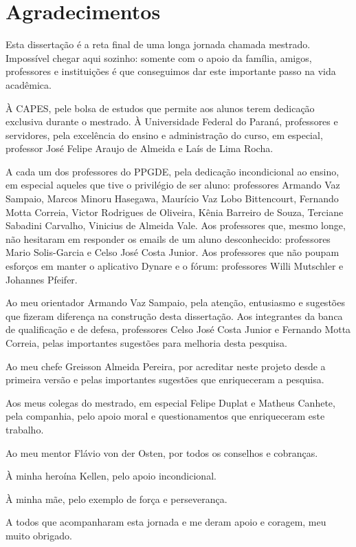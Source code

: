 \documentclass[
thesis.tex
]{subfiles}
\begin{document}
	
	\newpage
	
	\section*{Agradecimentos} %

	Esta dissertação é a reta final de uma longa jornada chamada mestrado. Impossível chegar aqui sozinho: somente com o apoio da família, amigos, professores e instituições é que conseguimos dar este importante passo na vida acadêmica.
	
	À CAPES, pele bolsa de estudos que permite aos alunos terem dedicação exclusiva durante o mestrado. À Universidade Federal do Paraná, professores e servidores, pela excelência do ensino e administração do curso, em especial, professor José Felipe Araujo de Almeida e Laís de Lima Rocha.

	A cada um dos professores do PPGDE, pela dedicação incondicional ao ensino, em especial aqueles que tive o privilégio de ser aluno: professores Armando Vaz Sampaio, Marcos Minoru Hasegawa, Maurício Vaz Lobo Bittencourt, Fernando Motta Correia, Victor Rodrigues de Oliveira, Kênia Barreiro de Souza, Terciane Sabadini Carvalho, Vinicius de Almeida Vale. Aos professores que, mesmo longe, não hesitaram em responder os emails de um aluno desconhecido: professores Mario Solis-Garcia e Celso José Costa Junior. Aos professores que não poupam esforços em manter o aplicativo Dynare e o fórum: professores Willi Mutschler e Johannes Pfeifer.
	
	Ao meu orientador Armando Vaz Sampaio, pela atenção, entusiasmo e sugestões que fizeram diferença na construção desta dissertação. Aos integrantes da banca de qualificação e de defesa, professores Celso José Costa Junior e Fernando Motta Correia, pelas importantes sugestões para melhoria desta pesquisa.

	Ao meu chefe Greisson Almeida Pereira, por acreditar neste projeto desde a primeira versão e pelas importantes sugestões que enriqueceram a pesquisa.
	
	Aos meus colegas do mestrado, em especial Felipe Duplat e Matheus Canhete, pela companhia, pelo apoio moral e questionamentos que enriqueceram este trabalho.
	
	Ao meu mentor Flávio von der Osten, por todos os conselhos e cobranças.
	
	À minha heroína Kellen, pelo apoio incondicional.
	
	À minha mãe, pelo exemplo de força e perseverança.
	
	A todos que acompanharam esta jornada e me deram apoio e coragem, meu muito obrigado.
	
	\thispagestyle{empty}
\end{document}
